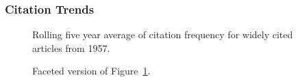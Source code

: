 \documentclass[
  10pt,
  letterpaper,
  DIV=11,
  numbers=noendperiod,
  twoside]{scrartcl}
\begin{document}
\subsubsection*{Citation Trends}\label{sec-trends-1957}

\begin{figure}


\caption{\label{fig-citation-spaghetti-1957}Rolling five year average of
citation frequency for widely cited articles from 1957.}

\end{figure}%

\begin{figure}


\caption{\label{fig-citation-facet-1957}Faceted version of
Figure~\ref{fig-citation-spaghetti-1957}.}

\end{figure}%
\end{document}
